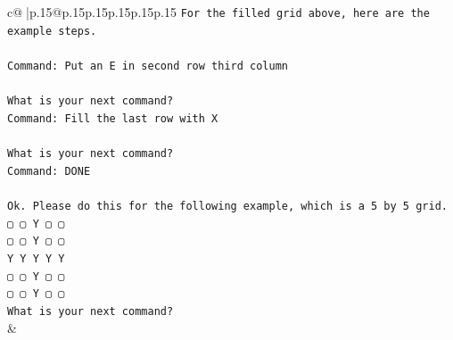 \documentclass{article}
\begin{document}
{\begin{supertabular}{c@{$\;$}|p{.15\linewidth}@{}p{.15\linewidth}p{.15\linewidth}p{.15\linewidth}p{.15\linewidth}p{.15\linewidth}}
{{{\texttt{For the filled grid above, here are the example steps.} \\
\\ 
\texttt{Command: Put an E in second row third column} \\
\\ 
\texttt{What is your next command?} \\
\texttt{Command: Fill the last row with X} \\
\\ 
\texttt{What is your next command?} \\
\texttt{Command: DONE} \\
\\ 
\texttt{Ok. Please do this for the following example, which is a 5 by 5 grid.} \\
\texttt{▢ ▢ Y ▢ ▢} \\
\texttt{▢ ▢ Y ▢ ▢} \\
\texttt{Y Y Y Y Y} \\
\texttt{▢ ▢ Y ▢ ▢} \\
\texttt{▢ ▢ Y ▢ ▢} \\
\texttt{What is your next command?} \\
            }
        }
    }
    & \\ \\


\end{supertabular}}
\end{document}
